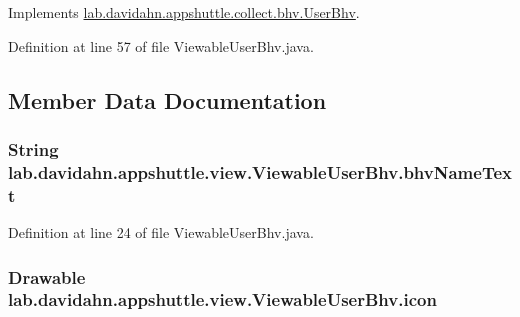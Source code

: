 \-Implements \hyperlink{interfacelab_1_1davidahn_1_1appshuttle_1_1collect_1_1bhv_1_1_user_bhv_a44d48ccb2bdafd12e1868af3427859fb}{lab.\-davidahn.\-appshuttle.\-collect.\-bhv.\-User\-Bhv}.



\-Definition at line 57 of file \-Viewable\-User\-Bhv.\-java.



\subsection{\-Member \-Data \-Documentation}
\hypertarget{classlab_1_1davidahn_1_1appshuttle_1_1view_1_1_viewable_user_bhv_a547cc62d3a117e5fa530a9533de4d2d1}{
\subsubsection[{bhv\-Name\-Text}]{\setlength{\rightskip}{0pt plus 5cm}\-String {\bf lab.\-davidahn.\-appshuttle.\-view.\-Viewable\-User\-Bhv.\-bhv\-Name\-Text}}}\label{classlab_1_1davidahn_1_1appshuttle_1_1view_1_1_viewable_user_bhv_a547cc62d3a117e5fa530a9533de4d2d1}


\-Definition at line 24 of file \-Viewable\-User\-Bhv.\-java.

\hypertarget{classlab_1_1davidahn_1_1appshuttle_1_1view_1_1_viewable_user_bhv_a19cdf3b4aa7489251bc2f88aa6f74383}{
\subsubsection[{icon}]{\setlength{\rightskip}{0pt plus 5cm}\-Drawable {\bf lab.\-davidahn.\-appshuttle.\-view.\-Viewable\-User\-Bhv.\-icon}}}\label{classlab_1_1davidahn_1_1appshuttle_1_1view_1_1_viewable_user_bhv_a19cdf3b4aa7489251bc2f88aa6f74383}


